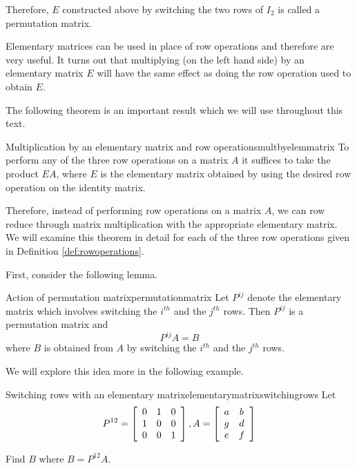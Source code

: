 Therefore, $E$ constructed above by switching the two rows of $I_2$ is called a permutation matrix. 

Elementary matrices can be used in place of row operations and therefore are very useful. It turns
out that multiplying (on the left hand side) by an elementary matrix $E$ will have the
same effect as doing the row operation used to obtain $E$.

The following theorem is an important result which we will use throughout this text. 

\begin{theorem}{Multiplication by an elementary matrix and row operations}{multbyelemmatrix}
To perform any of the three row operations on a matrix $A$
it suffices to take the product $EA$, where $E$ is the elementary matrix obtained by 
using the desired row operation on the identity matrix.
\end{theorem}

Therefore, instead of performing row operations on a matrix $A$, we
can row reduce through matrix multiplication with the appropriate
elementary matrix. We will examine this theorem in detail for each of
the three row operations given in Definition \ref{def:rowoperations}.

First, consider the following lemma.

\begin{lemma}{Action of permutation matrix}{permutationmatrix}
Let $P^{ij}$ denote the elementary matrix which involves
switching the $i^{th}$ and the $j^{th}$ rows. Then $P^{ij}$ is a permutation matrix and 
\begin{equation*}
P^{ij}A=B
\end{equation*}
where $B$ is obtained from $A$ by switching the $i^{th}$ and the $j^{th}$
rows.
\end{lemma}

We will explore this idea more in the following example.

\begin{example}{Switching rows with an elementary matrix}{elementarymatrixswitchingrows}
Let
\begin{equation*}
P^{12} = \left[
\begin{array}{rrr}
0 & 1 & 0 \\
1 & 0 & 0 \\
0 & 0 & 1
\end{array}
\right], A = \left[
\begin{array}{cc}
a & b \\
g & d \\
e & f
\end{array}
\right] 
\end{equation*}

Find $B$ where $B = P^{12}A$.
\end{example}

